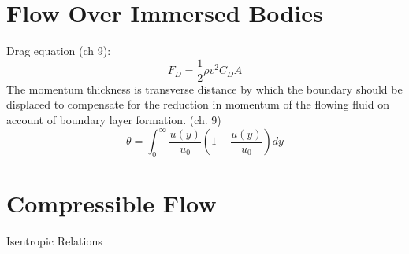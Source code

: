 \documentclass{article}
\begin{document}
%
%
\newpage
\section{Flow Over Immersed Bodies}



Drag equation (ch 9): 
\begin{equation}
  F_D = \frac{1}{2}\rho v^2 C_D A
\end{equation}
\newline
\newline
The momentum thickness is transverse distance by which the boundary should be displaced to compensate for the reduction in momentum of the flowing fluid on account of boundary layer formation. (ch. 9)
\begin{equation}
  \theta = \int^\infty_0 \frac{u(y)}{u_0}(1-\frac{u(y)}{u_0})dy
\end{equation}
\newline
\newline


%
%
\newpage
\section{Compressible Flow}

Isentropic Relations

\end{document}

